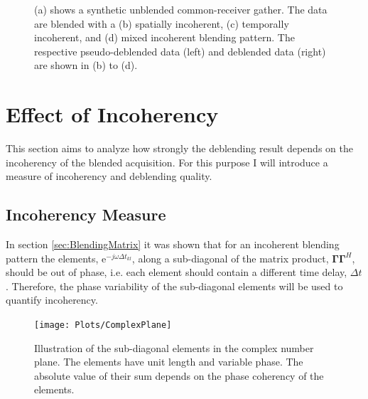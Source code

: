 \begin{figure}
	\caption{(a) shows a synthetic unblended common-receiver gather. The data are blended with a (b) spatially incoherent, (c) temporally incoherent, and (d) mixed incoherent blending pattern. The respective pseudo-deblended data (left) and deblended data (right) are shown in (b) to (d).}
	\label{fig:Ch-Results-Debl-x-inline}

\end{figure}


\FloatBarrier
\section{Effect of Incoherency} \label{sec:Effect-of-Incoherency}

This section aims to analyze how strongly the deblending result depends on the incoherency of the blended acquisition. For this purpose I will introduce a measure of incoherency and deblending quality.

\subsection*{Incoherency Measure}



In section \ref{sec:BlendingMatrix} it was shown that for an incoherent blending pattern the elements, $\mathrm{e}^{-j \omega \Delta t_{kl}}$, along a sub-diagonal of the matrix product, $\mathbf{\Gamma \Gamma}^H$, should be out of phase, i.e. each element should contain a different time delay, $\Delta t$. Therefore, the phase variability of the sub-diagonal elements will be used to quantify incoherency. 

\begin{figure}
	\centering
	\texttt{[image: Plots/ComplexPlane]}
	\caption{Illustration of the sub-diagonal elements in the complex number plane. The elements have unit length and variable phase. The absolute value of their sum depends on the phase coherency of the elements.}
	\label{fig:Ch-Results-complex-circle}
\end{figure}

